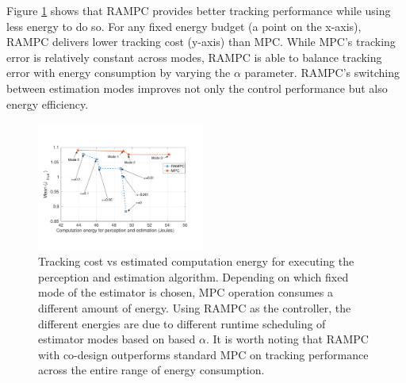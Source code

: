 Figure \ref{fig:TrackingVsEnergy} shows that RAMPC provides better tracking performance while using less energy to do so. For any fixed energy budget (a point on the x-axis), RAMPC delivers lower tracking cost (y-axis) than MPC. While MPC's tracking error is relatively constant across modes, RAMPC is able to balance tracking error with energy consumption by varying the $\alpha$ parameter. RAMPC's switching between estimation modes improves not only the control performance but also energy efficiency.


\begin{figure}[tb]
	\centering
	\includegraphics[width=0.49\textwidth, trim = 0 20mm 0 0]{figures/TrackingVsEnergy}
	\caption{Tracking cost vs estimated computation energy for executing the perception and estimation algorithm. Depending on which fixed mode of the estimator is chosen, MPC operation consumes a different amount of energy. Using RAMPC as the controller, the different energies are due to different runtime scheduling of estimator modes based on based $\alpha$. It is worth noting that RAMPC with co-design outperforms standard MPC on tracking performance across the entire range of energy consumption.}
	\label{fig:TrackingVsEnergy}
\end{figure}


